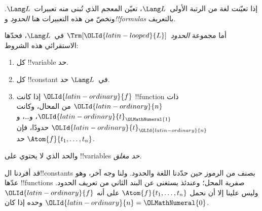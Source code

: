 \documentclass[../../../include/open-logic-section]{subfiles}
\begin{document}


إذا تعيّنت لغة من الرتبة الأولى~$\Lang L$، تعيّن المعجم الذي تُبنى
منه تعبيرات~$\Lang L$. ونخصّ من هذه التعبيرات هنا
\emph{الحدود} و\emph{!!{formula}s} بالتعريف.

\begin{defn}[الحدود]
أما مجموعة \emph{الحدود}~$\Trm[\OLId{latin-looped}{L}]$ في~$\Lang L$، فحدّها الاستقرائي
هذه الشروط:
\begin{enumerate}
\item كل !!{variable} حد.
\item كل !!{constant} في~$\Lang L$ حد.
\item إذا كانت $\OLId{latin-ordinary}{f}$ !!{function} ذات $\OLId{latin-ordinary}{n}$ من المحال، وكانت
  $\OLId{latin-ordinary}{t}_\OLMathNumeral{1}$، و\dots، و$\OLId{latin-ordinary}{t}_\OLId{latin-ordinary}{n}$ حدودًا، فإن
  $\Atom{f}{t_1, \ldots, t_n}$ حد.
\end{enumerate}
والحد الذي لا يحتوي على !!{variable}s \emph{حد مغلق}.
\end{defn}

\begin{explain}
قد أفردنا ال!!{constant}s بصنف من الرموز حين حدّدنا اللغة والحدود.
ولنا وجه آخر، وهو عدّها !!{function}s صفرية المحل؛ وعندئذ يستغنى
عن البند الثاني من تعريف الحدود. وليس علينا إلا أن نحمل $\Atom{f}{t_1, \ldots, t_n}$ على أنه $\OLId{latin-ordinary}{f}$ وحده إذا
كان $\OLId{latin-ordinary}{n} = \OLMathNumeral{0}$.
\end{explain}
\end{document}
